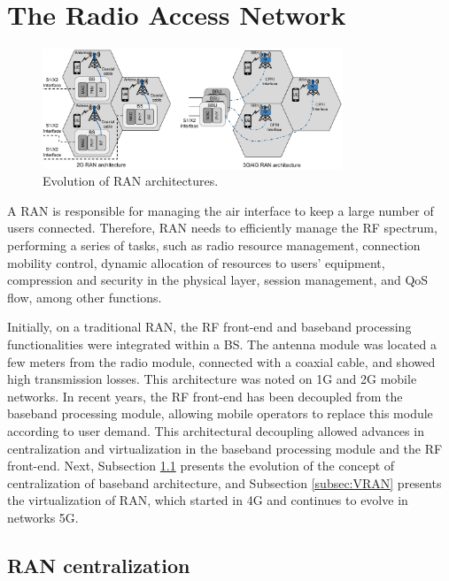 \section{The Radio Access Network}\label{sec:RAN}

\begin{figure}[ht]
 \begin{center}
\includegraphics[width=0.8\textwidth]{figs/EvolucaoRAN_1.pdf}
  \end{center}
\caption{Evolution of RAN architectures.}
\label{fig:evolucaoRAN}
\end{figure}

A RAN is responsible for managing the air interface to keep a large number of users connected. Therefore, RAN needs to efficiently manage the RF spectrum, performing a series of tasks, such as radio resource management, connection mobility control, dynamic allocation of resources to users' equipment, compression and security in the physical layer, session management, and QoS flow, among other functions.

Initially, on a traditional RAN, the RF front-end and baseband processing functionalities were integrated within a BS. The antenna module was located a few meters from the radio module, connected with a coaxial cable, and showed high transmission losses. This architecture was noted on 1G and 2G mobile networks. In recent years, the RF front-end has been decoupled from the baseband processing module, allowing mobile operators to replace this module according to user demand. This architectural decoupling allowed advances in centralization and virtualization in the baseband processing module and the RF front-end. Next, Subsection \ref{subsec:CRAN} presents the evolution of the concept of centralization of baseband architecture, and Subsection \ref{subsec:VRAN} presents the virtualization of RAN, which started in 4G and continues to evolve in networks 5G.


\subsection{RAN centralization} \label{subsec:CRAN}

